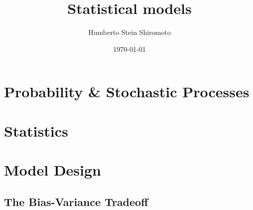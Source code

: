 \documentclass[sfsidenotes,notoc,nobib,a4paper]{tufte-book}
\title{Statistical models}
\author{Humberto Stein Shiromoto}
\date{\today}
\begin{document}
\setcounter{tocdepth}{1}
\maketitle




\tableofcontents
\adjustmtc
\printnomenclature

\part{Probability \& Stochastic Processes}


\part{Statistics}


\part{Model Design}

\chapter{The Bias-Variance Tradeoff}
\end{document}

